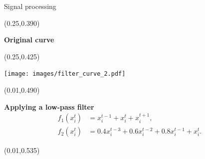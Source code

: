 \documentclass[final]{beamer}
\newenvironment{shaded2}{%
  \def\FrameCommand{\fboxsep=\FrameSep \colorbox{blue!20}}%
  \MakeFramed {\FrameRestore}}%
 {\endMakeFramed}
\begin{document}
\begin{frame}{}
\begin{textblock}{0.485}
\begin{block}{Signal processing \phantom{p}}
\begin{textblock}{0.485}(0.25,0.390)
\begin{minipage}{0.48\linewidth}
\begin{shaded}
\vspace{15pt}
\hspace{1cm} {\small \textbf{Original curve}}
\vspace{30pt}
\end{shaded}
\end{minipage}
\end{textblock}

\begin{textblock}{0.485}(0.25,0.425)
\begin{minipage}{0.48\linewidth}
\begin{shaded2}
\begin{center}

\texttt{[image: images/filter\_curve\_2.pdf]}
\end{center}
\vspace{15pt}
\end{shaded2}
\end{minipage}
\end{textblock}

\begin{textblock}{0.485}(0.01,0.490)
\begin{minipage}{0.48\linewidth}
\begin{shaded2}
\vspace{1pt}
{\color{lightgreen} \textbf{Applying a low-pass filter}}
\vspace{-5pt}
\begin{align*}
f_1(x^t_i) &= x^{t-1}_i + x^t_i + x^{t+1}_i,\\
f_2(x^t_i) &= 0.4 x^{t-3}_i + 0.6 x^{t-2}_i + 0.8 x^{t-1}_i + x_i^t.
\end{align*}
\vspace{-10pt}
\end{shaded2}
\end{minipage}
\end{textblock}

\begin{textblock}{0.485}(0.01,0.535)
\begin{minipage}{0.48\linewidth}
\begin{shaded}
\begin{center}


\end{center}
\end{shaded}
\end{minipage}
\end{textblock}
\end{block}
\end{textblock}
\end{frame}
\end{document}
